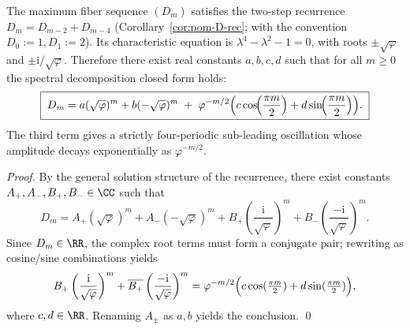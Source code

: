 \begin{proposition}\label{prop:pom-D-spectral-decomposition-fourperiod}
The maximum fiber sequence \((D_m)\) satisfies the two-step recurrence \(D_m=D_{m-2}+D_{m-4}\) (Corollary~\ref{cor:pom-D-rec}; with the convention \(D_0:=1,D_1:=2\)).
Its characteristic equation is \(\lambda^4-\lambda^2-1=0\), with roots \(\pm\sqrt{\varphi}\) and \(\pm \mathrm{i}/\sqrt{\varphi}\).
Therefore there exist real constants \(a,b,c,d\) such that for all \(m\ge 0\) the spectral decomposition closed form holds:
\[
\boxed{\;
D_m=a(\sqrt{\varphi})^{m}+b(-\sqrt{\varphi})^{m}
\;+\;\varphi^{-m/2}\Bigl(c\cos\!\Bigl(\frac{\pi m}{2}\Bigr)+d\sin\!\Bigl(\frac{\pi m}{2}\Bigr)\Bigr).\;}
\]
The third term gives a strictly four-periodic sub-leading oscillation whose amplitude decays exponentially as \(\varphi^{-m/2}\).
\end{proposition}

\begin{proof}
By the general solution structure of the recurrence, there exist constants \(A_+,A_-,B_+,B_-\in\CC\) such that
\[
D_m=A_+(\sqrt{\varphi})^m+A_-(-\sqrt{\varphi})^m
+B_+\left(\frac{\mathrm{i}}{\sqrt{\varphi}}\right)^m
+B_-\left(\frac{-\mathrm{i}}{\sqrt{\varphi}}\right)^m.
\]
Since \(D_m\in\RR\), the complex root terms must form a conjugate pair; rewriting as cosine/sine combinations yields
\[
B_+\left(\frac{\mathrm{i}}{\sqrt{\varphi}}\right)^m
+\overline{B_+}\left(\frac{-\mathrm{i}}{\sqrt{\varphi}}\right)^m
=\varphi^{-m/2}\Bigl(c\cos(\tfrac{\pi m}{2})+d\sin(\tfrac{\pi m}{2})\Bigr),
\]
where \(c,d\in\RR\).
Renaming \(A_\pm\) as \(a,b\) yields the conclusion. \qed
\end{proof}

\endinput
